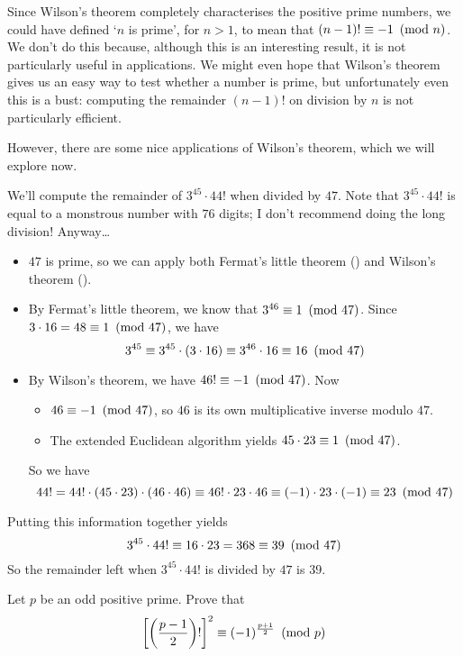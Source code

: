 Since Wilson's theorem completely characterises the positive prime numbers, we could have defined `$n$ is prime', for $n > 1$, to mean that $(n-1)! \equiv -1 ~\left(\text{mod}~n\right)$. We don't do this because, although this is an interesting result, it is not particularly useful in applications. We might even hope that Wilson's theorem gives us an easy way to test whether a number is prime, but unfortunately even this is a bust: computing the remainder $(n-1)!$ on division by $n$ is not particularly efficient.

However, there are some nice applications of Wilson's theorem, which we will explore now.

\begin{example}
We'll compute the remainder of $3^{45} \cdot 44!$ when divided by $47$. Note that $3^{45} \cdot 44!$ is equal to a monstrous number with $76$ digits; I don't recommend doing the long division! Anyway\dots{}
\begin{itemize} 
\item $47$ is prime, so we can apply both Fermat's little theorem () and Wilson's theorem ().
\item By Fermat's little theorem, we know that $3^{46} \equiv 1 ~\left(\text{mod}~47\right)$. Since $3 \cdot 16 = 48 \equiv 1 ~\left(\text{mod}~47\right)$, we have
\[ 3^{45} \equiv 3^{45} \cdot (3 \cdot 16) \equiv 3^{46} \cdot 16 \equiv 16 ~\left(\text{mod}~47\right) \]
\item By Wilson's theorem, we have $46! \equiv -1 ~\left(\text{mod}~47\right)$. Now
\begin{itemize}
\item $46 \equiv -1 ~\left(\text{mod}~47\right)$, so $46$ is its own multiplicative inverse modulo $47$.
\item The extended Euclidean algorithm yields $45 \cdot 23 \equiv 1 ~\left(\text{mod}~47\right)$.
\end{itemize}
So we have
\[ 44! = 44! \cdot (45 \cdot 23) \cdot (46 \cdot 46) \equiv 46! \cdot 23 \cdot 46 \equiv (-1) \cdot 23 \cdot (-1) \equiv 23 ~\left(\text{mod}~47\right) \]
\end{itemize}
Putting this information together yields
\[ 3^{45} \cdot 44! \equiv 16 \cdot 23 = 368 \equiv 39 ~\left(\text{mod}~47\right) \]
So the remainder left when $3^{45} \cdot 44!$ is divided by $47$ is $39$.
\end{example}

\begin{exercise}
Let $p$ be an odd positive prime. Prove that
\[ \left[ \left( \frac{p-1}{2} \right)! \right]^2 \equiv (-1)^{\frac{p+1}{2}} ~\left(\text{mod}~p\right) \]
\end{exercise}

